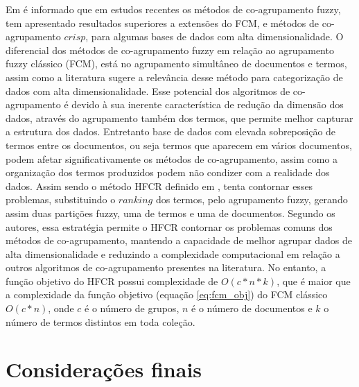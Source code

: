 Em \cite{Yan2013} é informado que em estudos recentes os métodos de co-agrupamento fuzzy,
tem apresentado resultados superiores a extensões do FCM, e métodos de co-agrupamento $crisp$, para
algumas bases de dados com alta dimensionalidade. O diferencial dos métodos de co-agrupamento fuzzy 
em relação ao agrupamento fuzzy clássico (FCM), está no agrupamento simultâneo de documentos e
termos, assim como a literatura sugere a relevância desse método para categorização de dados com
alta dimensionalidade\cite{Yan2013}. Esse potencial dos algoritmos de co-agrupamento é devido 
à sua inerente característica de redução da dimensão dos dados, através do agrupamento também dos
termos, que permite melhor capturar a estrutura dos dados. Entretanto base de dados com elevada
sobreposição de termos entre os documentos, ou seja termos que aparecem em vários documentos, podem
afetar significativamente os métodos de co-agrupamento, assim como a organização dos termos
produzidos podem não condizer com a realidade dos dados\cite{Tjhi2008}. Assim sendo o método HFCR
definido em \cite{Tjhi2008}, tenta contornar esses problemas, substituindo o $ranking$ dos termos,
pelo agrupamento fuzzy, gerando assim duas partições fuzzy, uma de termos e uma de documentos.
Segundo os autores, essa estratégia permite o HFCR contornar os problemas comuns dos métodos de
co-agrupamento, mantendo a capacidade de melhor agrupar dados de alta dimensionalidade e 
reduzindo a complexidade computacional em relação a outros algoritmos de co-agrupamento presentes na
literatura. No entanto, a função objetivo do HFCR possui complexidade de $O(c*n*k)$, que é maior que a
complexidade da função objetivo (equação \ref{eq:fcm_obj}) do FCM clássico $O(c*n)$, onde $c$ é o número de
grupos, $n$ é o número de documentos e $k$ o número de termos distintos em toda coleção.
 
\section{Considerações finais}

